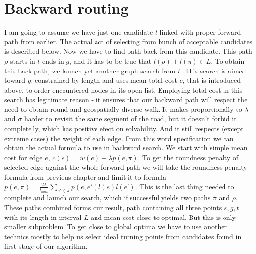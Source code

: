 \documentclass{ctuthesis}
\begin{document}
\section{Backward routing}
I am going to assume we have just one candidate \(t\) linked with proper forward path from earlier. The actual act of selecting from bunch of acceptable candidates is described below. Now we have to find path back from this candidate. This path \(\rho\) starts in \(t\) ends in \(g\), and it has to be true that \(l(\rho) + l(\pi) \in L\). To obtain this back path, we launch yet another graph search from \(t\). This search is aimed toward \(g\), constrained by length and uses mean total cost \(c\), that is introduced above, to order encountered nodes in its open list. Employing total cost in this search has legitimate reason - it ensures that our backward path will respect the need to obtain round and geospatially diverse walk. It makes proportionally to \(\lambda\) and \(\sigma\) harder to revisit the same segment of the road, but it doesn't forbid it completelly, which has positive efect on solvability. And it still respects (except extreme cases) the weight of each edge. From this word specification we can obtain the actual formula to use in backward search. We start with simple mean cost for edge \(e\), \(c(e) = w(e) + \lambda p(e, \pi)\). To get the roundness penalty of selected edge against the whole forward path we will take the roundness penalty formula from previous chapter and limit it to formula \(p(e, \pi) = \frac {2 \lambda} {l_{max}} \sum_{e' \in \pi}{p(e, e') l(e) l(e')}\). This is the last thing needed to complete and launch our search, which if successful yields two paths \(\pi\) and \(\rho\). These paths combined forms our result, path containing all three points \(s, g, t\) with its length in interval \(L\) and mean cost close to optimal. But this is only smaller subproblem. To get close to global optima we have to use another technics mostly to help us select ideal turning points from candidates found in first stage of our algorithm.
\end{document}
